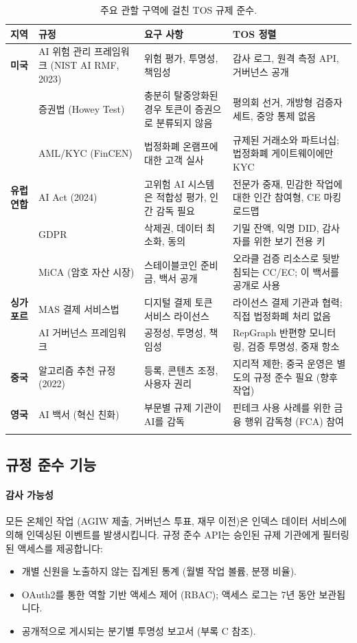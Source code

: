 \documentclass[11pt]{article}
\begin{document}
\begin{longtable}{@{}p{}p{}p{}p{}@{}}
\toprule
\textbf{지역} & \textbf{규정} & \textbf{요구 사항} & \textbf{TOS 정렬} \\\midrule
\textbf{미국} & AI 위험 관리 프레임워크 (NIST AI RMF, 2023) & 위험 평가, 투명성, 책임성 & 감사 로그, 원격 측정 API, 거버넌스 공개 \\
 & 증권법 (Howey Test) & 충분히 탈중앙화된 경우 토큰이 증권으로 분류되지 않음 & 평의회 선거, 개방형 검증자 세트, 중앙 통제 없음 \\
 & AML/KYC (FinCEN) & 법정화폐 온램프에 대한 고객 실사 & 규제된 거래소와 파트너십; 법정화폐 게이트웨이에만 KYC \\
\textbf{유럽 연합} & AI Act (2024) & 고위험 AI 시스템은 적합성 평가, 인간 감독 필요 & 전문가 중재, 민감한 작업에 대한 인간 참여형, CE 마킹 로드맵 \\
 & GDPR & 삭제권, 데이터 최소화, 동의 & 기밀 잔액, 익명 DID, 감사자를 위한 보기 전용 키 \\
 & MiCA (암호 자산 시장) & 스테이블코인 준비금, 백서 공개 & 오라클 검증 리소스로 뒷받침되는 CC/EC; 이 백서를 공개로 사용 \\
\textbf{싱가포르} & MAS 결제 서비스법 & 디지털 결제 토큰 서비스 라이선스 & 라이선스 결제 기관과 협력; 직접 법정화폐 처리 없음 \\
 & AI 거버넌스 프레임워크 & 공정성, 투명성, 책임성 & RepGraph 반편향 모니터링, 검증 투명성, 중재 항소 \\
\textbf{중국} & 알고리즘 추천 규정 (2022) & 등록, 콘텐츠 조정, 사용자 권리 & 지리적 제한; 중국 운영은 별도의 규정 준수 필요 (향후 작업) \\
\textbf{영국} & AI 백서 (혁신 친화) & 부문별 규제 기관이 AI를 감독 & 핀테크 사용 사례를 위한 금융 행위 감독청 (FCA) 참여 \\
\bottomrule
\caption{주요 관할 구역에 걸친 TOS 규제 준수.}
\end{longtable}

\subsection{규정 준수 기능}

\paragraph{감사 가능성}
모든 온체인 작업 (AGIW 제출, 거버넌스 투표, 재무 이전)은 인덱스 데이터 서비스에 의해 인덱싱된 이벤트를 발생시킵니다. 규정 준수 API는 승인된 규제 기관에게 필터링된 액세스를 제공합니다:
\begin{itemize}[noitemsep]
  \item 개별 신원을 노출하지 않는 집계된 통계 (월별 작업 볼륨, 분쟁 비율).
  \item OAuth2를 통한 역할 기반 액세스 제어 (RBAC); 액세스 로그는 7년 동안 보관됩니다.
  \item 공개적으로 게시되는 분기별 투명성 보고서 (부록 C 참조).
\end{itemize}
\end{document}
